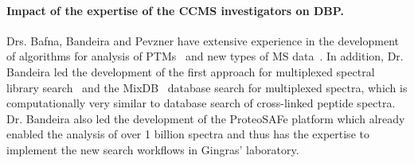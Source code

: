 \documentclass[arial,11pt]{article}
\newcommand{\NeedRevision}[1]{\textcolor{red}{#1}}
\begin{document}
%
%
%

\paragraph{Impact of the expertise of the CCMS investigators on DBP.} Drs. Bafna, Bandeira and Pevzner have extensive experience in the development of algorithms for analysis of PTMs~\cite{tsur05,bandeira07pnas,na11} and new types of MS data~\cite{kim09msdict,kim10cidetd}. In addition, Dr. Bandeira led the development of the first approach for multiplexed spectral library search~\cite{wang10} and the MixDB~\cite{wang11} database search for multiplexed spectra, which is computationally very similar to database search of cross-linked peptide spectra. Dr. Bandeira also led the development of the ProteoSAFe platform which already enabled the analysis of over 1 billion spectra and thus has the  expertise to implement the new search workflows in Gingras' laboratory.




\end{document}
